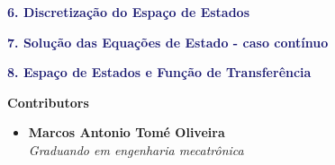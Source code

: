 \documentclass[a4]{article}
\let\oldtextbf\textbf
\renewcommand{\textbf}[1]{\textcolor{customgreen}{\oldtextbf{#1}}}
\begin{document}
\begin{tcolorbox}[colback=cyan!15, colframe=white, boxrule=0pt, arc=0pt]
\textbf{\textcolor{MidnightBlue}{6. Discretização do Espaço de Estados }} \hfill \textbf{\pageref{sec:discretizacao_espaco_estados}}
\end{tcolorbox}
\begin{tcolorbox}[colback=cyan!15, colframe=white, boxrule=0pt, arc=0pt]
\textbf{\textcolor{MidnightBlue}{7. Solução das Equações de Estado  - caso contínuo}} \hfill \textbf{\pageref{sec:solucao_espaco_estados}}
\end{tcolorbox}

\begin{tcolorbox}[colback=cyan!15, colframe=white, boxrule=0pt, arc=0pt]
\textbf{\textcolor{MidnightBlue}{8. Espaço de Estados e Função de Transferência}} \hfill \textbf{\pageref{sec:solucao_espaco_estados}}
\end{tcolorbox}
\newpage
\begin{center}
    \Large\textbf{Contributors}\\[2em]

    \begin{itemize}
        \item \textbf{Marcos Antonio Tomé Oliveira} \\\textit{Graduando em engenharia mecatrônica}\\[0.5em]

    \end{itemize}

\end{center}
\newpage







\end{document}

